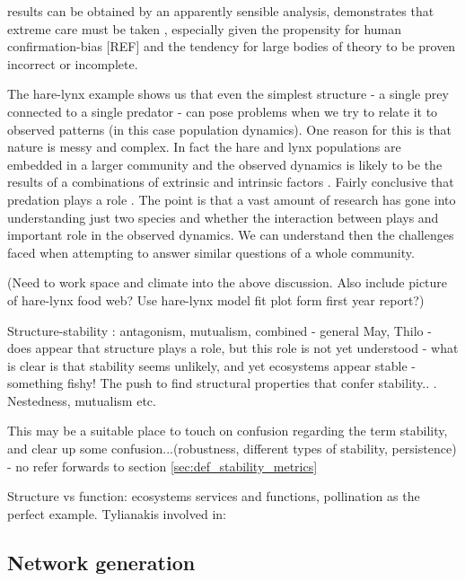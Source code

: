 results can be obtained by an apparently sensible analysis, demonstrates that extreme care must be taken , especially given the propensity for human confirmation-bias [REF] and the tendency for large bodies of theory to be proven incorrect or incomplete.     

The hare-lynx example shows us that even the simplest structure - a single prey connected to a single predator - can pose problems when we try to relate it to observed patterns (in this case population dynamics). One reason for this is that nature is messy and complex. In fact the hare and lynx populations are embedded in a larger community \cite{stenseth1997population} and the observed dynamics is likely to be the results of a combinations of extrinsic and intrinsic factors \cite{andreassen2013new}. Fairly conclusive that predation plays a role \cite{krebs2011lemmings}. The point is that a vast amount of research has gone into understanding just two species and whether the interaction between plays and important role in the observed dynamics. We can understand then the challenges faced when attempting to answer similar questions of a whole community.


(Need to work space and climate into the above discussion. Also include picture of hare-lynx food web? Use hare-lynx model fit plot form first year report?)


Structure-stability : antagonism, mutualism, combined - general May, Thilo - does appear that structure plays a role, but this role is not yet understood - what is clear is that stability seems unlikely, and yet ecosystems appear stable - something fishy! The push to find structural properties that confer stability.. \cite{van2016food, jansen2003complexity}. Nestedness, mutualism etc.

This may be a suitable place to touch on confusion regarding the term stability, and clear up some confusion...(robustness, different types of stability, persistence) - no refer forwards to section \ref{sec:def_stability_metrics}

Structure vs function: ecosystems services and functions, pollination as the perfect example.
Tylianakis involved in: \cite{thompson2012food}

\subsection{Network generation}
\label{sec:intro_net_gen}


